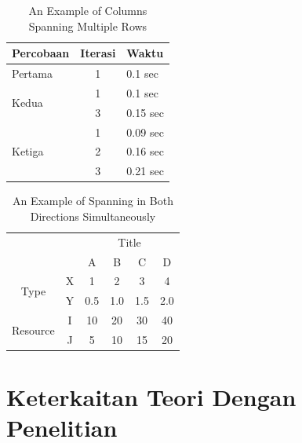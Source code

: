 \begin{table}
	\centering
	\caption{An Example of Columns Spanning Multiple Rows}
	\label{column.spanning}
	\begin{tabular}{|l|c|l|}
		\hline
		Percobaan & Iterasi & Waktu \\
		\hline
		Pertama & 1 & 0.1 sec \\ \hline
		\multirow{2}{*}{Kedua} & 1 & 0.1 sec \\
		& 3 & 0.15 sec \\
		\hline
		\multirow{3}{*}{Ketiga} & 1 & 0.09 sec \\
		& 2 & 0.16 sec \\
		& 3 & 0.21 sec \\
		\hline
	\end{tabular}
\end{table}

\begin{table}
	\centering
	\caption{An Example of Spanning in Both Directions Simultaneously}
	\label{mix.spanning}
	\begin{tabular}{cc|c|c|c|c|}
		\cline{3-6}
		& & \multicolumn{4}{|c|}{Title} \\ \cline{3-6} & & A & B & C & D \\
		\hline
		\multicolumn{1}{|c|}{\multirow{2}{*}{Type}} & \multicolumn{1}{|c|}{X} &
		1 & 2 & 3 & 4\\ \cline{2-6} \multicolumn{1}{|c|}{}
		& \multicolumn{1}{|c|}{Y} & 0.5 & 1.0 & 1.5 & 2.0\\ \cline{1-6}
		\multicolumn{1}{|c|}{\multirow{2}{*}{Resource}} &
		\multicolumn{1}{|c|}{I} & 10 & 20 & 30 & 40\\ \cline{2-6}
		\multicolumn{1}{|c|}{}                        & \multicolumn{1}{|c|}{J}
		& 5 & 10 & 15 & 20\\ \cline{1-6}
	\end{tabular}
\end{table}


\section{Keterkaitan Teori Dengan Penelitian}


